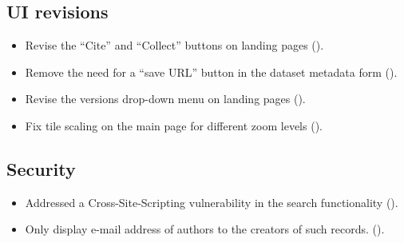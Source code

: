 \subsection*{UI revisions}
\begin{itemize}
\item{Revise the ``Cite'' and ``Collect'' buttons on landing pages
    ().}
\item{Remove the need for a ``save URL'' button in the dataset metadata form
    ().}
\item{Revise the versions drop-down menu on landing pages
    ().}
\item{Fix tile scaling on the main page for different zoom levels
    ().}
\end{itemize}
\subsection*{Security}

\begin{itemize}
\item{Addressed a Cross-Site-Scripting vulnerability in the search functionality
    ().}
\item{Only display e-mail address of authors to the creators of such records.
    ().}
\end{itemize}


